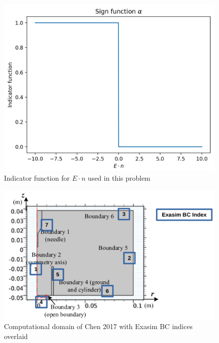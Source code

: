 \documentclass[12pt, a4paper]{report}
\begin{document}
\begin{figure}[!h]
    \centering
    \includegraphics*[width=.8\linewidth]{indicator_fcn.png}
    \caption{Indicator function for $E \cdot n$ used in this problem}
\end{figure}



\begin{figure}[!h]
    \centering
    \includegraphics*[width=.99\linewidth]{exasim_bc_index.png}
    \caption{Computational domain of Chen 2017 with Exasim BC indices overlaid}
    \label{<label>}
\end{figure}
\end{document}
